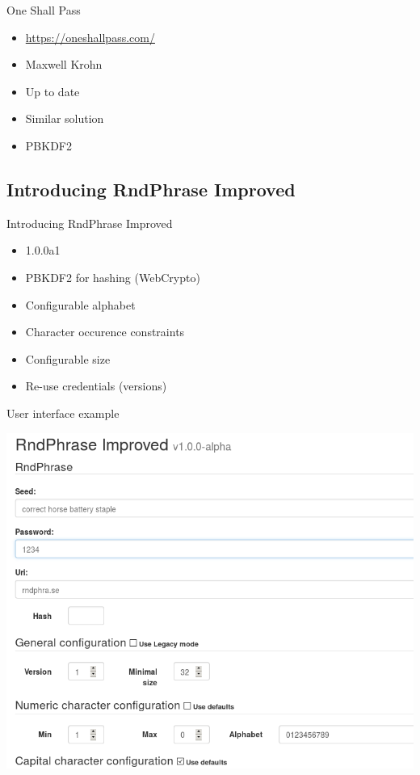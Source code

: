 \documentclass{beamer}
\begin{document}
\begin{frame}{One Shall Pass}
  \begin{itemize}
    \item \url{https://oneshallpass.com/}
    \item Maxwell Krohn
    \item Up to date
    \item Similar solution
    \item PBKDF2
  \end{itemize}
\end{frame}


\subsection{Introducing RndPhrase Improved}
\begin{frame}{Introducing RndPhrase Improved}
  \begin{itemize}
    \item 1.0.0a1
    \item PBKDF2 for hashing (WebCrypto)
    \item Configurable alphabet
    \item Character occurence constraints
    \item Configurable size
    \item Re-use credentials (versions)
  \end{itemize}
\end{frame}

\begin{frame}{User interface example}
  \begin{center}
    \includegraphics[scale=0.35]{rndphrase-screenshot.png}
  \end{center}
\end{frame}
\end{document}
